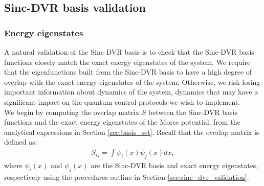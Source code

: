 \documentclass{subfiles}
\begin{document}
\subsection{Sinc-DVR basis validation}
\subsubsection*{Energy eigenstates}
A natural validation of the Sinc-DVR basis is to check that the Sinc-DVR basis functions closely match the exact energy eigenstates of the system. We require that the eigenfunctions built from the Sinc-DVR basis to have a high degree of overlap with the exact energy eigenstates of the system. Otherwise, we risk losing important information about dynamics of the system, dynamics that may have a significant impact on the quantum control protocols we wish to implement.\\ 

We begin by computing the overlap matrix $S$ between the Sinc-DVR basis functions and the exact energy eigenstates of the Morse potential, from the analytical expressions in Section \ref{sec:basis_set}. Recall that the overlap matrix is defined as:
\begin{align*}
    S_{ij} = \int \psi_i(x) \psi_j(x) dx,
\end{align*}
where $\psi_i(x)$ and $\psi_j(x)$ are the Sinc-DVR basis and exact energy eigenstates, respectively using the procedures outline in Section \ref{sec:sinc_dvr_validation}.
\end{document}
